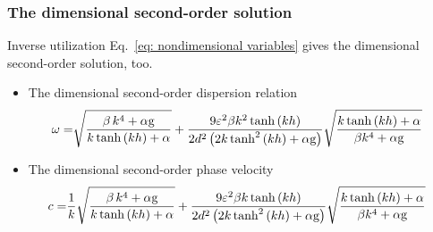 \subsubsection{The dimensional second-order solution}
Inverse utilization Eq.~\eqref{eq: nondimensional variables} gives the dimensional second-order solution, too.
\begin{itemize}
    \item The dimensional second-order dispersion relation
    \begin{equation}
    \begin{aligned}
        \omega 
        = & 
        \sqrt {\frac {{\beta\,{k}^{4}+\alpha\mathrm{g}}}{ {k\tanh \left( kh \right) +\alpha}}} 
        + 
        \frac{ 9 \varepsilon^2 \beta k^2 \tanh\left(kh\right) }{ 2 d^2 \left( 2 k \tanh^2\left(kh\right) + \alpha \mathrm{g} \right) }
        \sqrt{\frac
        {k\tanh \left( kh \right) +\alpha}
        {\beta{k}^{4}+\alpha\mathrm{g}} }
    \end{aligned}
    \label{eq: 2.34}
\end{equation}
    
    \item The dimensional second-order phase velocity
    \begin{equation}
    \begin{aligned}
        c 
        = & 
        \frac{1}{k} \sqrt {\frac {{\beta\,{k}^{4}+\alpha\mathrm{g}}}{ {k\tanh \left( kh \right) +\alpha}}} 
        + 
        \frac{ 9 \varepsilon^2 \beta k \tanh\left(kh\right) }{ 2 d^2 \left( 2 k \tanh^2\left(kh\right) + \alpha \mathrm{g} \right) }
        \sqrt{\frac
        {k\tanh \left( kh \right) +\alpha}
        {\beta{k}^{4}+\alpha\mathrm{g}} }
    \end{aligned}
\end{equation}
\end{itemize}
